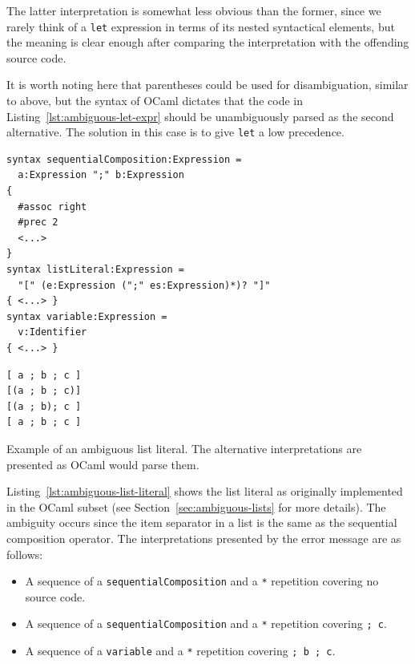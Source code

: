 \documentclass{kththesis}
\begin{document}
The latter interpretation is somewhat less obvious than the former, since we rarely think of a \texttt{let} expression in terms of its nested syntactical elements, but the meaning is clear enough after comparing the interpretation with the offending source code.

It is worth noting here that parentheses could be used for disambiguation, similar to above, but the syntax of OCaml dictates that the code in Listing~\ref{lst:ambiguous-let-expr} should be unambiguously parsed as the second alternative. The solution in this case is to give \texttt{let} a low precedence.

\begin{listing}[t]
\begin{verbatim}
syntax sequentialComposition:Expression =
  a:Expression ";" b:Expression
{
  #assoc right
  #prec 2
  <...>
}
syntax listLiteral:Expression =
  "[" (e:Expression (";" es:Expression)*)? "]"
{ <...> }
syntax variable:Expression =
  v:Identifier
{ <...> }
\end{verbatim}
\begin{verbatim}
[ a ; b ; c ]
[(a ; b ; c)]
[(a ; b); c ]
[ a ; b ; c ]
\end{verbatim}
\caption{Example of an ambiguous list literal. The alternative interpretations are presented as OCaml would parse them.}
\label{lst:ambiguous-list-literal}
\end{listing}

Listing~\ref{lst:ambiguous-list-literal} shows the list literal as originally implemented in the OCaml subset (see Section~\ref{sec:ambiguous-lists} for more details). The ambiguity occurs since the item separator in a list is the same as the sequential composition operator. The interpretations presented by the error message are as follows:

\begin{itemize}
  \item A sequence of a \texttt{sequentialComposition} and a \texttt{*} repetition covering no source code.
  \item A sequence of a \texttt{sequentialComposition} and a \texttt{*} repetition covering \texttt{; c}.
  \item A sequence of a \texttt{variable} and a \texttt{*} repetition covering \texttt{; b ; c}.
\end{itemize}
\end{document}
